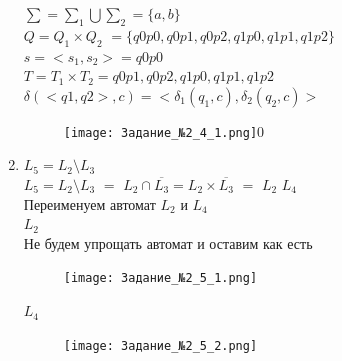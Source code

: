 \documentclass[a4paper]{article}
\begin{document}
\begin{enumerate}
$\sum = \sum_1 \bigcup \sum_2 = \{a, b\}$\\
$Q = Q_1 \times Q_2$ $= \{q0p0, q0p1, q0p2, q1p0, q1p1, q1p2 \}$\\
$s = <s_1, s_2> = q0p0$\\
$T = T_1 \times T_2 = q0p1, q0p2, q1p0, q1p1, q1p2 $\\
$ \delta(<q1, q2>, c) = <\delta_1(q_1, c), \delta_2(q_2, c)>$\\ 
\begin{figure}[h]
\centering
\texttt{[image: Задание\_№2\_4\_1.png]}0
\end{figure}
\hfill \break
\item {$L_5 = L_2 \setminus L_3 $}\\
$L_5 = L_2 \setminus L_3 $ $=$ $L_2 \cap \overline{L_3} = L_2 \times  \overline{L_3}$  $=$ $L_2$ \times $L_4$\\
Переименуем автомат $L_2$ и $L_4$\\
$L_2$\\
Не будем упрощать автомат и оставим как есть\\
\hfill \break
\begin{figure}[h]
\centering
\texttt{[image: Задание\_№2\_5\_1.png]}
\end{figure}

$L_4$\\
\hfill \break
\begin{figure}[h]
\centering
\texttt{[image: Задание\_№2\_5\_2.png]}
\end{figure}


\end{enumerate}
\end{document}
